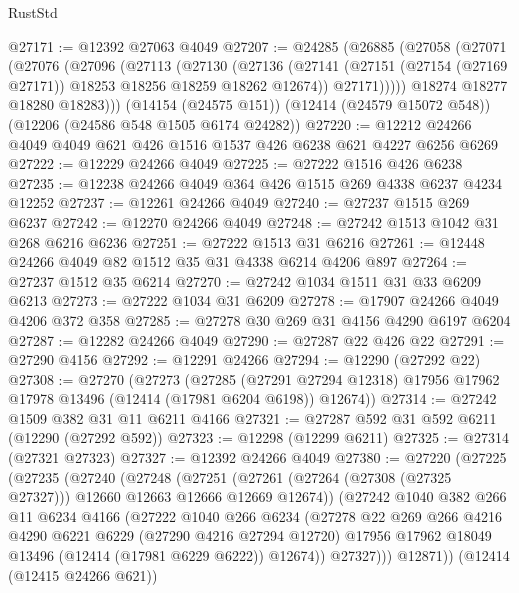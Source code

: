 \begin{lexlean}{RustStd}
\begin{coremodule}
@27171 := @12392 @27063 @4049
@27207 := @24285
    (@26885
      (@27058
        (@27071
          (@27076
            (@27096
              (@27113
                (@27130
                  (@27136
                    (@27141 (@27151 (@27154 (@27169 @27171)) @18253 @18256 @18259 @18262 @12674))
                    @27171)))))
          @18274
          @18277
          @18280
          @18283)))
    (@14154 (@24575 @151))
    (@12414 (@24579 @15072 @548))
    (@12206 (@24586 @548 @1505 @6174 @24282))
@27220 := @12212 @24266 @4049 @4049 @621 @426 @1516 @1537 @426 @6238 @621 @4227 @6256 @6269
@27222 := @12229 @24266 @4049
@27225 := @27222 @1516 @426 @6238
@27235 := @12238 @24266 @4049 @364 @426 @1515 @269 @4338 @6237 @4234 @12252
@27237 := @12261 @24266 @4049
@27240 := @27237 @1515 @269 @6237
@27242 := @12270 @24266 @4049
@27248 := @27242 @1513 @1042 @31 @268 @6216 @6236
@27251 := @27222 @1513 @31 @6216
@27261 := @12448 @24266 @4049 @82 @1512 @35 @31 @4338 @6214 @4206 @897
@27264 := @27237 @1512 @35 @6214
@27270 := @27242 @1034 @1511 @31 @33 @6209 @6213
@27273 := @27222 @1034 @31 @6209
@27278 := @17907 @24266 @4049 @4206 @372 @358
@27285 := @27278 @30 @269 @31 @4156 @4290 @6197 @6204
@27287 := @12282 @24266 @4049
@27290 := @27287 @22 @426 @22
@27291 := @27290 @4156
@27292 := @12291 @24266
@27294 := @12290 (@27292 @22)
@27308 := @27270
    (@27273
      (@27285
        (@27291 @27294 @12318)
        @17956
        @17962
        @17978
        @13496
        (@12414 (@17981 @6204 @6198))
        @12674))
@27314 := @27242 @1509 @382 @31 @11 @6211 @4166
@27321 := @27287 @592 @31 @592 @6211 (@12290 (@27292 @592))
@27323 := @12298 (@12299 @6211)
@27325 := @27314 (@27321 @27323)
@27327 := @12392 @24266 @4049
@27380 := @27220
    (@27225
      (@27235
        (@27240
          (@27248
            (@27251 (@27261 (@27264 (@27308 (@27325 @27327))) @12660 @12663 @12666 @12669 @12674))
            (@27242
              @1040
              @382
              @266
              @11
              @6234
              @4166
              (@27222
                @1040
                @266
                @6234
                (@27278
                  @22
                  @269
                  @266
                  @4216
                  @4290
                  @6221
                  @6229
                  (@27290 @4216 @27294 @12720)
                  @17956
                  @17962
                  @18049
                  @13496
                  (@12414 (@17981 @6229 @6222))
                  @12674))
              @27327)))
        @12871))
    (@12414 (@12415 @24266 @621))

\end{coremodule}
\end{lexlean}
